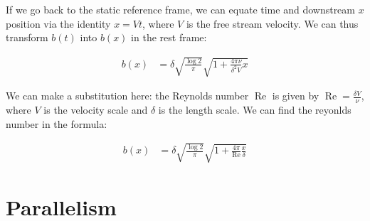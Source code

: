 \documentclass{article}
\DeclareMathOperator\Reynolds{Re}
\begin{document}
If we go back to the static reference frame, we can equate time and downstream
	$x$ position via the identity $x = V t$, where $V$ is the free
	stream velocity.
We can thus transform $b(t)$ into $b(x)$ in the rest frame:

\begin{align}
b(x) & = \delta \sqrt{\frac{\log 2}{\pi}} \sqrt{1 + \frac{4 \pi \nu}{\delta^2 V} x}
\end{align}

We can make a substitution here: the Reynolds number $\Reynolds$ is given by
	$\Reynolds = \frac{\delta V}{\nu}$, where $V$ is the velocity scale
	and $\delta$ is the length scale.
We can find the reyonlds number in the formula:

\begin{align}
b(x) & = \delta \sqrt{\frac{\log 2}{\pi}} 
	\sqrt{1 + \frac{4 \pi}{\Reynolds} \frac{x}{\delta}}
\end{align}

\section{Parallelism}
\end{document}
